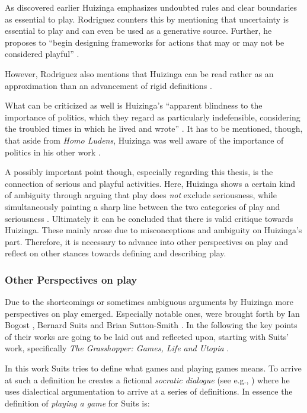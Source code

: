 As discovered earlier Huizinga emphasizes undoubted rules and clear boundaries as essential to play. Rodriguez counters this by mentioning that uncertainty is essential to play and can even be used as a generative source. Further, he proposes to \enquote{begin designing frameworks for actions that may or may not be considered playful} \cite{rodriguez2006playful}.

However, Rodriguez also mentions that Huizinga can be read rather as an approximation than an advancement of rigid definitions \cite{rodriguez2006playful}.

What can be criticized as well is Huizinga's \enquote{apparent blindness to the importance of politics, which they regard as particularly indefensible, considering the troubled times in which he lived and wrote} \cite[p. 84]{anchor1978history}. It has to be mentioned, though, that aside from \textit{Homo Ludens}, Huizinga was well aware of the importance of politics in his other work \cite[p. 85]{anchor1978history}.

A possibly important point though, especially regarding this thesis, is the connection of serious and playful activities. Here, Huizinga shows a certain kind of ambiguity through arguing that play does \textit{not} exclude seriousness, while simultaneously painting a sharp line between the two categories of play and seriousness \cite[p. 87]{anchor1978history}. Ultimately it can be concluded that there is valid critique towards Huizinga. These mainly arose due to misconceptions and ambiguity on Huizinga's part. Therefore, it is necessary to advance into other perspectives on play and reflect on other stances towards defining and describing play.

\subsubsection{Other Perspectives on play}

Due to the shortcomings or sometimes ambiguous arguments by Huizinga more perspectives on play emerged. Especially notable ones, were brought forth by Ian Bogost \cite{bogost2007persuasive}, Bernard Suits \cite{suits2020grasshopper} and Brian Sutton-Smith \cite{sutton2009ambiguity}. In the following the key points of their works are going to be laid out and reflected upon, starting with Suits' work, specifically \textit{The Grasshopper: Games, Life and Utopia} \cite{suits2020grasshopper}.

In this work Suits tries to define what games and playing games means. To arrive at such a definition he creates a fictional \textit{socratic dialogue} (see e.g., \cite{berlin2004methodology}) where he uses dialectical argumentation to arrive at a series of definitions. In essence the definition of \textit{playing a game} for Suits is:

